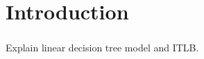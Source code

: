 \section{Introduction}
\begin{frame}\frametitle{\insertsection}\justifying
Explain linear decision tree model and \textsc{ITLB}.
\end{frame}

